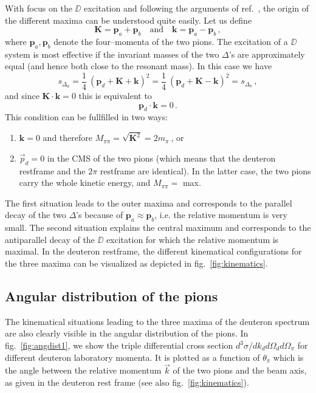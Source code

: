 With focus on the $\DD$ excitation and following the arguments of ref.\ 
\cite{risser73}, the origin of the different maxima can
be understood quite easily. Let us define
%
\begin{equation}
  \label{eq:res7}
  \mathbf K = \mathbf p_a + \mathbf p_b \quad \text{and} \quad 
  \mathbf k = \mathbf p_a - \mathbf p_b \, ,
\end{equation}
%
where $\mathbf p_a, \mathbf p_b$ denote the four--momenta of the 
two pions. The excitation of a $\DD$ system is most effective if
the invariant masses of the two $\Delta$'s are approximately equal
(and hence both close to the resonant mass). In this case we have
%
\begin{equation}
  \label{eq:res8}
  s_{\Delta_a} = \frac{1}{4} \: ({\mathbf p_d + \mathbf K + \mathbf k})^2 = 
  \frac{1}{4} \: ({\mathbf p_d + \mathbf K - \mathbf k})^2 = s_{\Delta_b} \: ,
\end{equation}
%
and since $\mathbf K \cdot \mathbf k = 0$ this is equivalent to 
%
\begin{equation}
  \mathbf p_d \cdot \mathbf k = 0 \, .
\end{equation}
%
This condition can be fullfilled in two ways:
\begin{enumerate}
\item  $\mathbf k = 0$ and therefore $M_{\pi\pi} = \sqrt{\mathbf K^2} = 2 m_\pi \:$, or
\item $\vec p_d = 0$ in the CMS of the two pions (which means that the deuteron restframe
  and the $2\pi$ restframe are identical). In the latter case, the two pions carry
  the whole kinetic energy, and $M_{\pi\pi} = $ max.
\end{enumerate}
%
The first situation leads to the outer maxima and corresponds to the parallel
decay of the two $\Delta$'s because of $\mathbf p_a \approx \mathbf p_b$, i.e. 
the relative momentum is very small.
The second situation explains the central maximum and corresponds 
to the antiparallel decay of the $\DD$ excitation for which the relative
momentum is maximal.  
In the deuteron restframe, the different kinematical configurations for the 
three maxima can be visualized as depicted in fig.\ \ref{fig:kinematics}.


\subsection{Angular distribution of the pions}
\label{sec:angdist}

The kinematical situations leading to the three maxima of the deuteron spectrum
are also clearly visible in the angular distribution of the pions.
In fig.\ \ref{fig:angdist1}, we show the triple differential cross section
$d^3 \sigma / dk_d d\Omega_d d\Omega_\pi$ for different deuteron laboratory momenta.
It is plotted as a function of $\theta_\pi$ which is the angle between the
relative momentum $\vec k$ of the two pions and the beam axis, as given 
in the deuteron rest frame (see also fig.\ \ref{fig:kinematics}).

